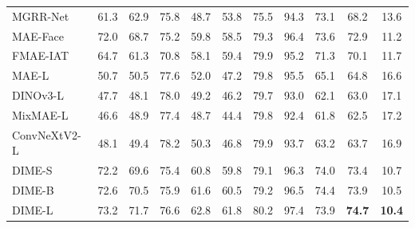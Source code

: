\documentclass[10pt,journal,compsoc]{IEEEtran}
\newcommand{\BestScore}[1]{\textcolor{DIMEBestText}{#1}}
\newcommand{\SecondScore}[1]{\textcolor{DIMESecondText}{#1}}
\begin{document}
\begin{table}[!t]
\begin{minipage}[t]{\dimexpr(\textwidth-\columnsep)/2\relax}
{\begin{tabular}{@{}l*{10}{c}@{}}
    MGRR-Net \cite{ge2024mgrr}
    & 61.3 & 62.9 & 75.8 & 48.7 & 53.8
    & 75.5 & 94.3 & 73.1
    & 68.2 & 13.6 \\

    MAE-Face \cite{ma2024facial}
    & 72.0 & 68.7 & 75.2 & 59.8 & 58.5
    & 79.3 & 96.4 & 73.6
    & 72.9 & 11.2 \\

    FMAE-IAT \cite{ning2024representation}
    & 64.7 & 61.3 & 70.8 & 58.1 & 59.4
    & 79.9 & 95.2 & 71.3
    & 70.1 & 11.7 \\
    \midrule

    MAE-L \cite{he2022masked}
    & 50.7 & 50.5 & 77.6 & 52.0 & 47.2
    & 79.8 & 95.5 & 65.1
    & 64.8 & 16.6 \\

    DINOv3-L \cite{simeoni2025dinov3}
    & 47.7 & 48.1 & 78.0 & 49.2 & 46.2
    & 79.7 & 93.0 & 62.1
    & 63.0 & 17.1 \\

    MixMAE-L \cite{liu2023mixmae}
    & 46.6 & 48.9 & 77.4 & 48.7 & 44.4
    & 79.8 & 92.4 & 61.8
    & 62.5 & 17.2 \\

    ConvNeXtV2-L \cite{woo2023convnext}
    & 48.1 & 49.4 & 78.2 & 50.3 & 46.8
    & 79.9 & 93.7 & 63.2
    & 63.7 & 16.9 \\
    \midrule

    DIME-S
    & 72.2 & 69.6 & 75.4 & 60.8 & 59.8
    & 79.1 & 96.3 & \SecondScore{74.0}
    & 73.4 & 10.7 \\

    DIME-B
    & \SecondScore{72.6}
    & \SecondScore{70.5}
    & 75.9
    & \SecondScore{61.6}
    & \SecondScore{60.5}
    & 79.2
    & \SecondScore{96.5}
    & \BestScore{74.4}
    & \SecondScore{73.9}
    & \SecondScore{10.5} \\

    DIME-L
    & \BestScore{73.2}
    & \BestScore{71.7}
    & 76.6
    & \BestScore{62.8}
    & \BestScore{61.8}
    & \BestScore{80.2}
    & \BestScore{97.4}
    & 73.9
    & \BestScore{\textbf{74.7}}
    & \BestScore{\textbf{10.4}} \\


\end{tabular}}
\end{minipage}
\end{table}
\end{document}
